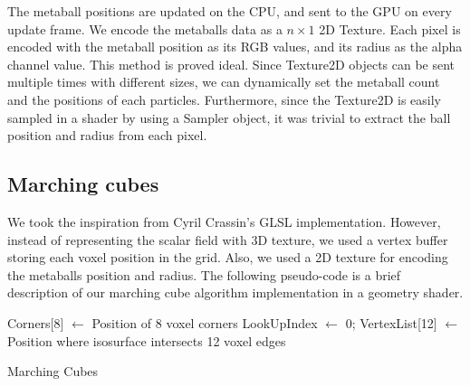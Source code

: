 \documentclass{article}
\begin{document}
\begin{multicols}{2}
        The metaball positions are updated on the CPU, and sent to the GPU on every update frame. We encode the metaballs data as a $n\times1$ 2D Texture. Each pixel is encoded with the metaball position as its RGB values, and its radius as the alpha channel value. This method is proved ideal. Since Texture2D objects can be sent multiple times with different sizes, we can dynamically set the metaball count and the positions of each particles. Furthermore, since the Texture2D is easily sampled in a shader by using a Sampler object, it was trivial to extract the ball position and radius from each pixel.

        \subsection{Marching cubes}
        	We took the inspiration from Cyril Crassin's GLSL implementation. \cite{crassin} However, instead of representing the scalar field with 3D texture, we used a vertex buffer storing each voxel position in the grid. Also, we used a 2D texture for encoding the metaballs position and radius. The following pseudo-code is a brief description of our marching cube algorithm implementation in a geometry shader.
        	
			\begin{algorithm}[H]
				Corners[8] $\leftarrow$ Position of 8 voxel corners\;
				LookUpIndex $\leftarrow$ 0;
				VertexList[12] $\leftarrow$ Position where isosurface intersects 12 voxel edges\;
				\caption{Marching Cubes}
			\end{algorithm}
        	

\end{multicols}
\end{document}
